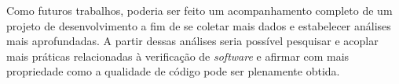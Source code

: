 Como futuros trabalhos, poderia ser feito um acompanhamento completo de um projeto de desenvolvimento a fim de se coletar mais dados e estabelecer análises mais aprofundadas. A partir dessas análises seria possível pesquisar e acoplar mais práticas relacionadas à verificação de \textit{software} e afirmar com mais propriedade como a qualidade de código pode ser plenamente obtida.